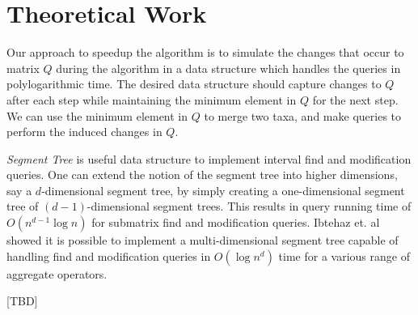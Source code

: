 \section{Theoretical Work}

Our approach to speedup the algorithm is to simulate the changes that occur to matrix $Q$ during the algorithm in a data structure which handles the queries in polylogarithmic time. The desired data structure should capture changes to $Q$ after each step while maintaining the minimum element in $Q$ for the next step. We can use the minimum element in $Q$ to merge two taxa, and make queries to perform the induced changes in $Q$.

\emph{Segment Tree} is useful data structure to implement interval find and modification queries. One can extend the notion of the segment tree into higher dimensions, say a $d$-dimensional segment tree, by simply creating a one-dimensional segment tree of $(d-1)$-dimensional segment trees. This results in query running time of $O(n^{d-1}\log{n})$ for submatrix find and modification queries. Ibtehaz et. al~\cite{ibtehaz2018multidimensional} showed it is possible to implement a multi-dimensional segment tree capable of handling find and modification queries in $O(\log{n}^d)$ time for a various range of aggregate operators.

[TBD]